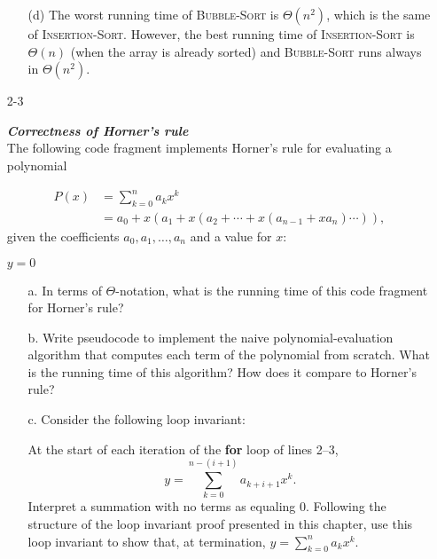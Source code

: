\begin{enumerate}
\begin{framed}
\begin{enumerate}
\item [(d)] The worst running time of \textsc{Bubble-Sort} is $\Theta(n^2)$,
which is the same of \textsc{Insertion-Sort}. However, the best running time of
\textsc{Insertion-Sort} is $\Theta(n)$ (when the array is already sorted) and
\textsc{Bubble-Sort} runs always in $\Theta(n^2)$.
\end{enumerate}

\end{framed}

\item[2{-}3]{\textbf{\emph{Correctness of Horner's rule}}\\
The following code fragment implements Horner's rule for evaluating a polynomial

\begin{equation*}
\begin{split}
  P(x) & = \sum_{k=0}^{n}{a_k x^k}\\
       & = a_0 + x(a_1 + x(a_2 + \cdots + x(a_{n - 1} + x a_n) \cdots)),
\end{split}
\end{equation*}
given the coefficients $a_0, a_1, \dots, a_n$ and a value for $x$:

\begin{algorithm}[H]
\SetAlgoNoEnd\DontPrintSemicolon%
\nl $y = 0$\;
\nl {}
\end{algorithm}

\begin{enumerate}
\item[a.] In terms of $\Theta$-notation, what is the running time of this code
fragment for Horner's rule?

\item[b.] Write pseudocode to implement the naive polynomial-evaluation
algorithm that computes each term of the polynomial from scratch. What is the
running time of this algorithm? How does it compare to Horner's rule?

\item[c.] Consider the following loop invariant:

At the start of each iteration of the \textbf{for} loop of lines 2{--}3,
\begin{equation*}
  y = \sum_{k = 0}^{n - (i + 1)}{a_{k + i + 1} x^k}.
\end{equation*}
Interpret a summation with no terms as equaling 0. Following the structure of
the loop invariant proof presented in this chapter, use this loop invariant
to show that, at termination, $y = \sum_{k = 0}^n{a_k x^k}$.


\end{enumerate}}
\end{enumerate}
